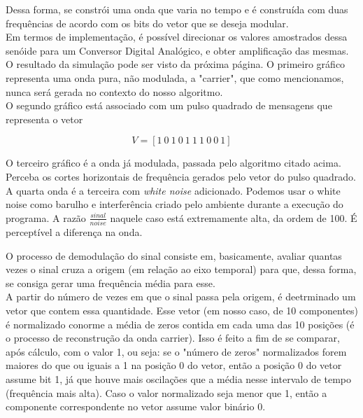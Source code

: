 \documentclass[11pt,a4paper]{report}
\begin{document}
	Dessa forma, se constrói uma onda que varia no tempo e é construída com duas frequências de acordo com os bits do vetor que se deseja modular.\\
	
	Em termos de implementação, é possível direcionar os valores amostrados dessa senóide para um Conversor Digital Analógico, e obter amplificação das mesmas.\\
	
	O resultado da simulação pode ser visto da próxima página. O primeiro gráfico representa uma onda pura, não modulada, a "carrier", que como mencionamos, nunca será gerada no contexto do nosso algoritmo.\\
	
	O segundo gráfico está associado com um pulso quadrado de mensagens que representa o vetor 
	
	\[V = [1\ 0\ 1\ 0\ 1\ 1\ 1\ 0\ 0\ 1]\]
	
	O terceiro gráfico é a onda já modulada, passada pelo algoritmo citado acima. Perceba os cortes horizontais de frequência gerados pelo vetor do pulso quadrado.\\
	
	A quarta onda é a terceira com {\it white noise} adicionado. Podemos usar o white noise como barulho e interferência criado pelo ambiente durante a execução do programa. A razão $\frac{sinal}{noise}$ naquele caso está extremamente alta, da ordem de 100. É perceptível a diferença na onda.
	
	
	
	O processo de demodulação do sinal consiste em, basicamente, avaliar quantas vezes o sinal cruza a origem (em relação ao eixo temporal) para que, dessa forma, se consiga gerar uma frequência média para esse.\\
	
	A partir do número de vezes em que o sinal passa pela origem, é deetrminado um vetor que contem essa quantidade. Esse vetor (em nosso caso, de 10 componentes) é normalizado conorme a média de zeros contida em cada uma das 10 posições (é o processo de reconstrução da onda carrier). Isso é feito a fim de se comparar, após cálculo, com o valor 1, ou seja: se o "número de zeros" normalizados forem maiores do que ou iguais a 1 na posição 0 do vetor, então a posição 0 do vetor assume bit 1, já que houve mais oscilações que a média nesse intervalo de tempo (frequência mais alta). Caso o valor normalizado seja menor que 1, então a componente correspondente no vetor assume valor binário 0.
	
\end{document}
